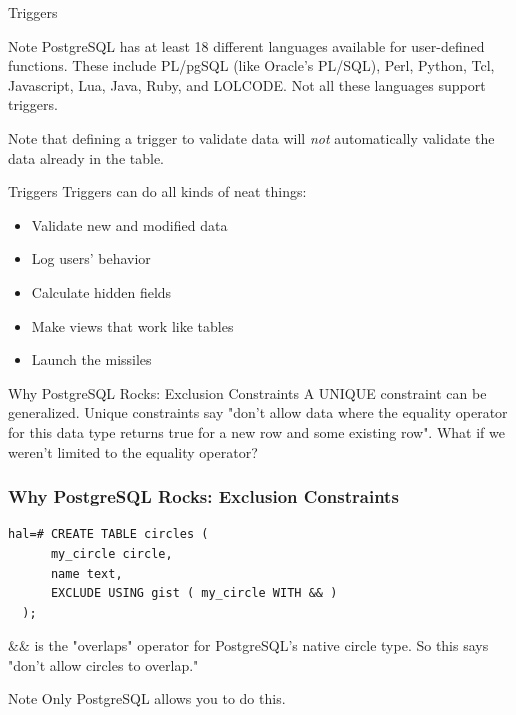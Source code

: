 \documentclass{beamer}
\begin{document}
\begin{frame}{Triggers}
    \begin{block}{Note}
        PostgreSQL has at least 18 different languages available for
        user-defined functions. These include PL/pgSQL (like Oracle's PL/SQL),
        Perl, Python, Tcl, Javascript, Lua, Java, Ruby, and LOLCODE. Not all
        these languages support triggers.
    \end{block}
    \vspace{0.1\textheight}

    Note that defining a trigger to validate data will \emph{not} automatically validate the data already in the table.
\end{frame}

\begin{frame}{Triggers}
    Triggers can do all kinds of neat things:
    \begin{itemize}
        \item Validate new and modified data
        \item Log users' behavior
        \item Calculate hidden fields
        \item Make views that work like tables
        \item Launch the missiles
    \end{itemize}
\end{frame}

\begin{frame}{Why PostgreSQL Rocks: Exclusion Constraints}
    A UNIQUE constraint can be generalized. Unique constraints say "don't allow
    data where the equality operator for this data type returns true for a new
    row and some existing row". What if we weren't limited to the equality
    operator?
\end{frame}

\begin{frame}[fragile]
    \frametitle{Why PostgreSQL Rocks: Exclusion Constraints}
    \begin{Verbatim}[fontfamily=courier]
  hal=# CREATE TABLE circles (
      my_circle circle,
      name text,
      EXCLUDE USING gist ( my_circle WITH && )
  );
    \end{Verbatim}
    \vspace{2px}
    \&\& is the "overlaps" operator for PostgreSQL's native circle type. So this says "don't allow circles to overlap."

    \begin{block}{Note}
        Only PostgreSQL allows you to do this.
    \end{block}
\end{frame}
\end{document}
